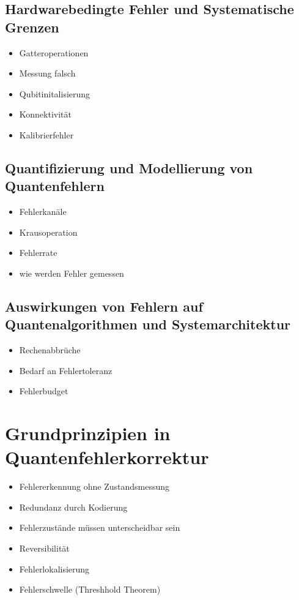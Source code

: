 \subsection{Hardwarebedingte Fehler und Systematische Grenzen}
\begin{itemize}
\item Gatteroperationen
\item Messung falsch
\item Qubitinitalisierung
\item Konnektivität
\item Kalibrierfehler
\end{itemize}

\subsection{Quantifizierung und Modellierung von Quantenfehlern}
\begin{itemize}
\item Fehlerkanäle
\item Krausoperation
\item Fehlerrate
\item wie werden Fehler gemessen
\end{itemize}

\subsection{Auswirkungen von Fehlern auf Quantenalgorithmen und Systemarchitektur}
\begin{itemize}
\item Rechenabbrüche
\item Bedarf an Fehlertoleranz
\item Fehlerbudget
\end{itemize}


\section{Grundprinzipien in Quantenfehlerkorrektur}
\begin{itemize}
\item Fehlererkennung ohne Zustandsmessung
\item Redundanz durch Kodierung
\item Fehlerzustände müssen unterscheidbar sein
\item Reversibilität
\item Fehlerlokalisierung
\item Fehlerschwelle (Threshhold Theorem)
\end{itemize}


